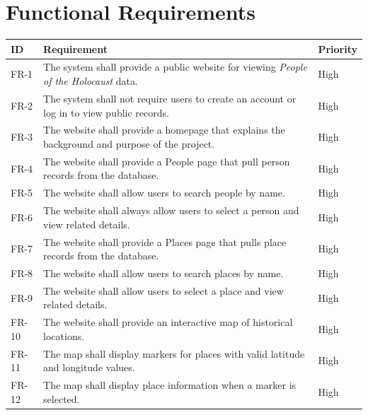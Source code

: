 \section{Functional Requirements}

\begin{longtable}{|p{}|p{}|p{}|}
	\hline
	\textbf{ID} & \textbf{Requirement}                                                                          & \textbf{Priority} \\
	\hline
	FR-1        & The system shall provide a public website for viewing \textit{People of the Holocaust} data.  & High              \\
	\hline
	FR-2        & The system shall not require users to create an account or log in to view public records.     & High              \\
	\hline
	FR-3        & The website shall provide a homepage that explains the background and purpose of the project. & High              \\
	\hline
	FR-4        & The website shall provide a People page that pull person records from the database.           & High              \\
	\hline
	FR-5        & The website shall allow users to search people by name.                                       & High              \\
	\hline
	FR-6        & The website shall always allow users to select a person and view related details.             & High              \\
	\hline
	FR-7        & The website shall provide a Places page that pulls place records from the database.           & High              \\
	\hline
	FR-8        & The website shall allow users to search places by name.                                       & High              \\
	\hline
	FR-9        & The website shall allow users to select a place and view related details.                     & High              \\
	\hline
	FR-10       & The website shall provide an interactive map of historical locations.                         & High              \\
	\hline
	FR-11       & The map shall display markers for places with valid latitude and longitude values.            & High              \\
	\hline
	FR-12       & The map shall display place information when a marker is selected.                            & High              \\

\end{longtable}
